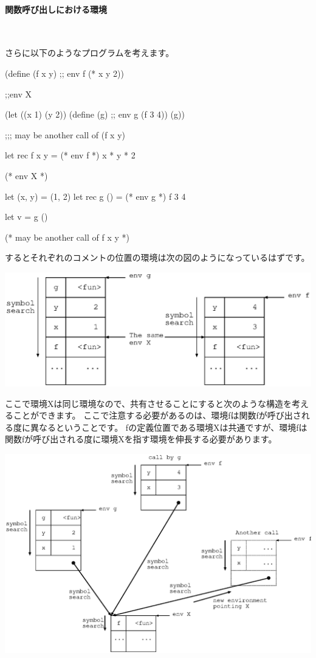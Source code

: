 \documentclass[mingoth,a4paper]{jsarticle}
\begin{document}
\paragraph{関数呼び出しにおける環境} \ 

さらに以下のようなプログラムを考えます。

\begin{commandline}
(define (f x y)
  ;; env f
  (* x y 2))

;;env X

(let ((x 1) (y 2))
  (define (g)
    ;; env g
    (f 3 4))
  (g))

;;; may be another call of (f x y)
\end{commandline}

\begin{commandline}
let rec f x y =
  (* env f *)
  x * y * 2

(* env X *)

let (x, y) = (1, 2)
let rec g () =
  (* env g *)
  f 3 4

let v = g ()

(* may be another call of f x y *)
\end{commandline}

するとそれぞれのコメントの位置の環境は次の図のようになっているはずです。

 \includegraphics[height=0.25\hsize]{image201002/caml-env005.eps}

ここで環境Xは同じ環境なので、共有させることにすると次のような構造を考えることができます。
ここで注意する必要があるのは、環境fは関数fが呼び出される度に異なるということです。
fの定義位置である環境Xは共通ですが、環境fは関数fが呼び出される度に環境Xを指す環境を伸長する必要があります。

 \includegraphics[height=0.5\hsize]{image201002/caml-env01.eps}
\end{document}

